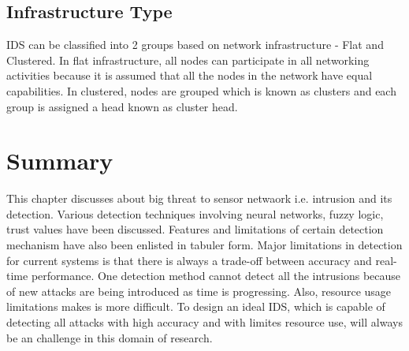 \subsection{Infrastructure Type}
IDS can be classified into 2 groups based on network infrastructure - Flat and Clustered. In flat infrastructure, all nodes can participate in all networking activities because it is\textcolor{white}{.}assumed that\textcolor{white}{.}all the nodes\textcolor{white}{.}in the network\textcolor{white}{.}have equal capabilities. In clustered, nodes are grouped which is known as clusters and each group is assigned a head known as cluster head.

\section{Summary}
This chapter discusses about big threat to sensor netwaork i.e. intrusion and its detection. Various detection techniques involving neural networks, fuzzy logic, trust values have been discussed. Features and limitations of certain detection mechanism have also been enlisted in tabuler form. Major limitations in detection for current systems is that there is always a trade-off between accuracy and real-time performance. One detection method cannot detect all the intrusions because of new attacks are being introduced as time is progressing. Also, resource usage limitations makes is more difficult. To design an ideal IDS, which is capable of detecting all attacks with high accuracy and with limites resource use, will always be an challenge in this domain of research.